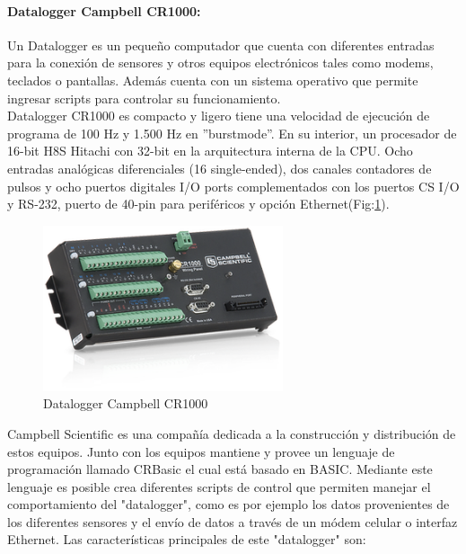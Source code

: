 \paragraph{Datalogger Campbell CR1000:}
Un Datalogger es un pequeño computador que cuenta con diferentes entradas para la conexión de sensores y otros equipos electrónicos tales como modems, teclados o pantallas. Además cuenta con un sistema operativo que permite ingresar scripts para controlar su funcionamiento.\\Datalogger CR1000 es compacto y ligero tiene una velocidad de ejecución de programa de 100 Hz y 1.500 Hz en ''burstmode''. En su interior, un procesador de 16-bit H8S Hitachi con 32-bit en la arquitectura interna de la CPU.
Ocho entradas analógicas diferenciales (16 single-ended), dos canales contadores
de pulsos y ocho puertos digitales I/O ports complementados con los puertos CS I/O y RS-232, puerto de 40-pin para periféricos y opción Ethernet(Fig:\ref{cr1000}).

\begin{figure}[h!]
	\centering
	\includegraphics[width=200pt]{images/cr1000}
	\caption{Datalogger Campbell CR1000}
	\label{cr1000}
\end{figure}

Campbell Scientific es una compañía dedicada a la construcción y distribución de estos equipos. Junto con los equipos mantiene y provee un lenguaje de programación llamado CRBasic el cual está basado en BASIC\cite{hardware:basic}. Mediante este lenguaje es posible crea diferentes scripts de control que permiten manejar el comportamiento del "datalogger", como es por ejemplo los datos provenientes de los diferentes sensores y el envío de datos a través de un módem celular o interfaz Ethernet. Las características principales de este "datalogger" son:

